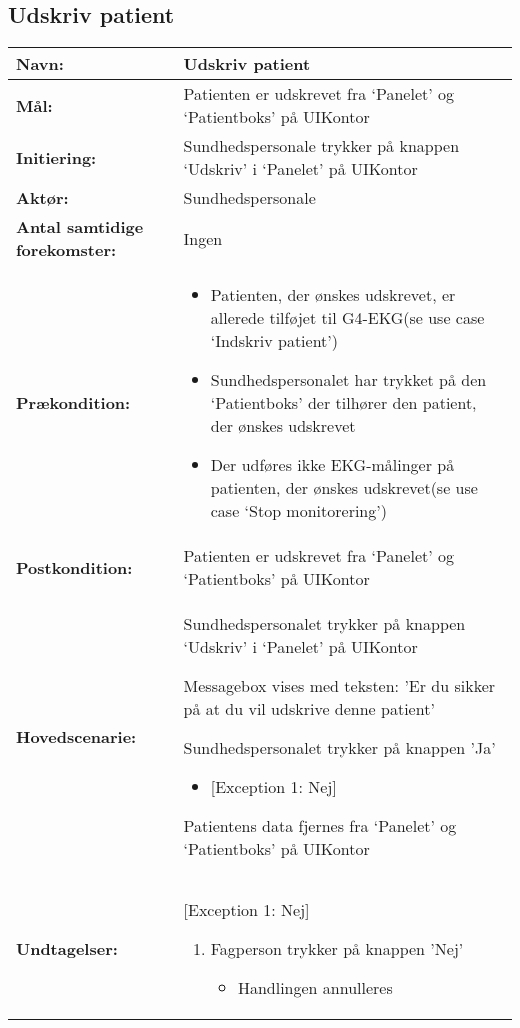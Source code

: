 \subsection{Udskriv patient}
\begin{table}[H]
\begin{tabular}{|l|p{10cm}|}
\hline
\textbf{Navn:} & \textbf{Udskriv patient}\\\hline
\textbf{Mål:} & Patienten er udskrevet fra ‘Panelet’ og ‘Patientboks’ på UIKontor \\\hline
\textbf{Initiering:} & Sundhedspersonale trykker på knappen ‘Udskriv’ i ‘Panelet’ på UIKontor \\\hline
\textbf{Aktør:} & Sundhedspersonale \\\hline
\textbf{Antal samtidige forekomster:} & Ingen \\\hline
\textbf{Prækondition:} & \begin{itemize}[label=$\circ$]
\item{Patienten, der ønskes udskrevet, er allerede tilføjet til G4-EKG(se use case ‘Indskriv patient’)}
\item{Sundhedspersonalet har trykket på den ‘Patientboks’ der tilhører den patient, der ønskes udskrevet}
\item{Der udføres ikke EKG-målinger på patienten, der ønskes udskrevet(se use case ‘Stop monitorering’)}
\end{itemize}
\\\hline
\textbf{Postkondition:} & Patienten er udskrevet fra ‘Panelet’ og ‘Patientboks’ på UIKontor \\\hline
\textbf{Hovedscenarie:} &
\begin{enumerate}
\item{Sundhedspersonalet trykker på knappen ‘Udskriv’ i ‘Panelet’ på UIKontor}
\item {Messagebox vises med teksten: 'Er du sikker på at du vil udskrive denne patient'
\item Sundhedspersonalet trykker på knappen 'Ja'}
{\begin{itemize}[label=$\circ$]
\item {[Exception 1: Nej] }
\end{itemize}}
\item{Patientens data fjernes fra ‘Panelet’ og ‘Patientboks’ på UIKontor}
\end{enumerate}\\\hline
\textbf{Undtagelser:} & [Exception 1: Nej]
\begin{enumerate}
\item {Fagperson trykker på knappen 'Nej'
\begin{itemize}[label=$\circ$]
\item {Handlingen annulleres}
\end{itemize}}
\end{enumerate}\\\hline
\end{tabular}
\end{table}

